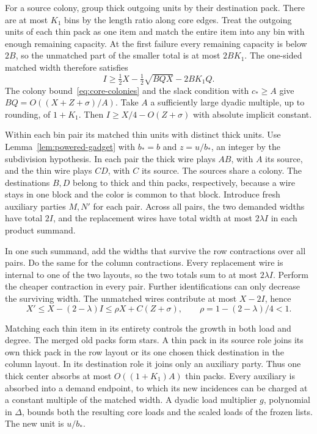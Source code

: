 For a source colony, group thick outgoing units by their destination pack. There are at most \(K_1\) bins by the length ratio along core edges. Treat the outgoing units of each thin pack as one item and match the entire item into any bin with enough remaining capacity. At the first failure every remaining capacity is below \(2B\), so the unmatched part of the smaller total is at most \(2BK_1\). The one-sided matched width therefore satisfies
\[
 I\ge \tfrac12X-\tfrac12\sqrt{BQX}-2BK_1Q.
\]
The colony bound~\eqref{eq:core-colonies} and the slack condition with \(c_*\ge A\) give \(BQ=O((X+Z+\sigma)/A)\). Take \(A\) a sufficiently large dyadic multiple, up to rounding, of \(1+K_1\). Then \(I\ge X/4-O(Z+\sigma)\) with absolute implicit constant.

Within each bin pair its matched thin units with distinct thick units.
Use Lemma~\ref{lem:powered-gadget} with \(b_*=b\) and \(z=u/b_*\), an
integer by the subdivision hypothesis. In each pair the thick wire plays
\(AB\), with \(A\) its source, and the thin wire plays \(CD\), with \(C\)
its source. The sources share a colony. The destinations \(B,D\) belong
to thick and thin packs, respectively, because a wire stays in one
block and the color is common to that block. Introduce fresh auxiliary
parties \(M,N'\) for each pair. Across all pairs, the two demanded
widths have total \(2I\), and the replacement wires have total width at
most \(2\lambda I\) in each product summand.

In one such summand, add the widths that survive the row contractions
over all pairs. Do the same for the column contractions. Every
replacement wire is internal to one of the two layouts, so the two
totals sum to at most \(2\lambda I\). Perform the cheaper contraction
in every pair. Further identifications can only decrease the surviving
width. The unmatched wires contribute at most \(X-2I\), hence
\[
 X'\le X-(2-\lambda)I\le\rho X+C(Z+\sigma),\qquad
 \rho=1-(2-\lambda)/4<1 .
\]

Matching each thin item in its entirety controls the growth in both load and degree. The merged old packs form stars. A thin pack in its source role joins its own thick pack in the row layout or its one chosen thick destination in the column layout. In its destination role it joins only an auxiliary party. Thus one thick center absorbs at most \(O((1+K_1)A)\) thin packs. Every auxiliary is absorbed into a demand endpoint, to which its new incidences can be charged at a constant multiple of the matched width. A dyadic load multiplier \(g\), polynomial in \(\Delta\), bounds both the resulting core loads and the scaled loads of the frozen lists. The new unit is \(u/b_*\).

